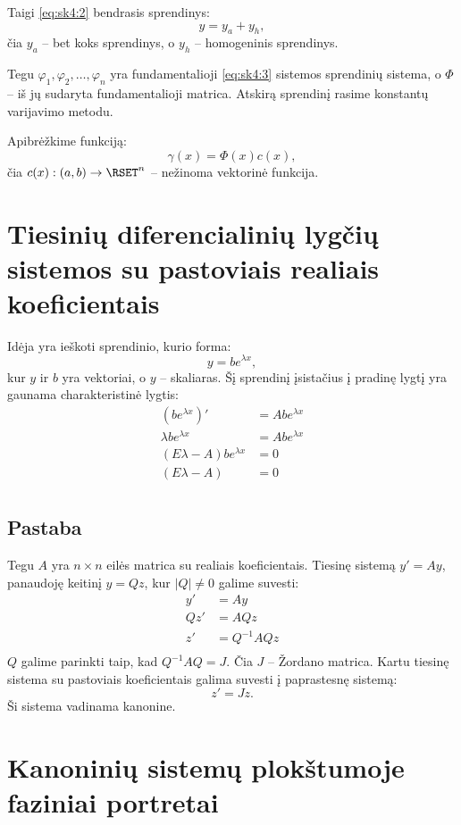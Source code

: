 Taigi \ref{eq:sk4:2} bendrasis sprendinys:
\begin{equation*}
  y = y_{a} + y_{h},
\end{equation*}
čia $y_{a}$ – bet koks sprendinys, o $y_{h}$ – homogeninis sprendinys.

Tegu $\varphi_{1}, \varphi_{2}, \ldots, \varphi_{n}$ yra
fundamentalioji \ref{eq:sk4:3} sistemos sprendinių sistema, o
$\Phi$ – iš jų sudaryta fundamentalioji matrica. Atskirą sprendinį
rasime konstantų varijavimo metodu.

Apibrėžkime funkciją:
\begin{equation*}
  \gamma(x) = \Phi(x)c(x),
\end{equation*}
čia $c(x) : (a, b) \to \RSET^{n}$ – nežinoma vektorinė funkcija.


\section{Tiesinių diferencialinių lygčių sistemos su pastoviais
realiais koeficientais}

\cite[119]{konspektas}

Idėja yra ieškoti sprendinio, kurio forma:
\begin{equation*}
  y = be^{\lambda x},
\end{equation*}
kur $y$ ir $b$ yra vektoriai, o $y$ – skaliaras. Šį sprendinį įsistačius
į pradinę lygtį yra gaunama charakteristinė lygtis:
\begin{align*}
  (b e^{\lambda x})' &= A b e^{\lambda x} \\
  \lambda b e^{\lambda x} &= A b e^{\lambda x} \\
  (E \lambda - A) b e^{\lambda x} &= 0 \\
  (E \lambda - A) &= 0 \\
\end{align*}

\subsection{Pastaba}


Tegu $A$ yra $n \times n$ eilės matrica su realiais koeficientais.
Tiesinę sistemą $y' = Ay$, panaudoję keitinį $y = Qz$, kur
$|Q| \neq 0$ galime suvesti:
\begin{align*}
  y' &= Ay \\
  Qz' &= AQz \\
  z' &= Q^{-1}AQz \\
\end{align*}
$Q$ galime parinkti taip, kad $Q^{-1}AQ = J$. Čia $J$ – Žordano
matrica. Kartu tiesinę sistema su pastoviais koeficientais
galima suvesti į paprastesnę sistemą:
\begin{equation*}
  z' = Jz.
\end{equation*}
Ši sistema vadinama kanonine.

\section{Kanoninių sistemų plokštumoje faziniai portretai}

\cite[126-129]{konspektas}
